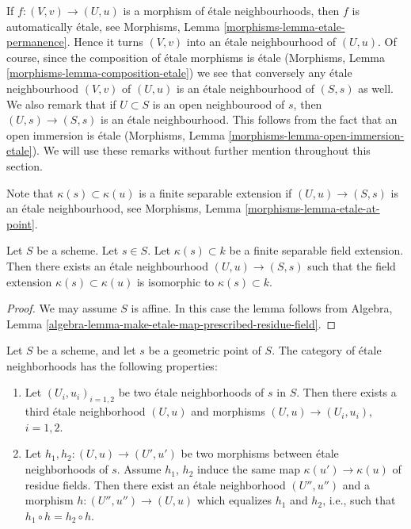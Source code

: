 \noindent
If $f : (V, v) \to (U, u)$ is a morphism of \'etale
neighbourhoods, then $f$ is automatically \'etale, see
Morphisms, Lemma \ref{morphisms-lemma-etale-permanence}.
Hence it turns $(V, v)$ into an \'etale neighbourhood of
$(U, u)$. Of course, since the composition of \'etale morphisms
is \'etale (Morphisms, Lemma \ref{morphisms-lemma-composition-etale})
we see that conversely any \'etale neighbourhood $(V, v)$ of
$(U, u)$ is an \'etale neighbourhood of $(S, s)$ as well.
We also remark that if $U \subset S$ is an open neighbourood
of $s$, then $(U, s) \to (S, s)$ is an \'etale neighbourhood.
This follows from the fact that an open immersion is
\'etale (Morphisms, Lemma \ref{morphisms-lemma-open-immersion-etale}).
We will use these remarks without further mention throughout this
section.

\medskip\noindent
Note that $\kappa(s) \subset \kappa(u)$ is a finite separable extension
if $(U, u) \to (S, s)$ is an \'etale neighbourhood,
see Morphisms, Lemma \ref{morphisms-lemma-etale-at-point}.

\begin{lemma}
\label{lemma-realize-presecribed-residue-field-extension-etale}
Let $S$ be a scheme.
Let $s \in S$.
Let $\kappa(s) \subset k$ be a finite separable field extension.
Then there exists an \'etale neighbourhood $(U, u) \to (S, s)$
such that the field extension $\kappa(s) \subset \kappa(u)$ is
isomorphic to $\kappa(s) \subset k$.
\end{lemma}

\begin{proof}
We may assume $S$ is affine.
In this case the lemma follows from
Algebra, Lemma \ref{algebra-lemma-make-etale-map-prescribed-residue-field}.
\end{proof}

\begin{lemma}
\label{lemma-etale-neighbourhoods-not-quite-filtered}
Let $S$ be a scheme, and let $s$ be a geometric point of $S$.
The category of \'etale neighborhoods has the following properties:
\begin{enumerate}
\item Let $(U_i, u_i)_{i=1, 2}$ be two \'etale neighborhoods of
$s$ in $S$. Then there exists a third \'etale neighborhood
$(U, u)$ and morphisms
$(U, u) \to (U_i, u_i)$, $i = 1, 2$.
\item Let $h_1, h_2: (U, u) \to (U', u')$ be two
morphisms between \'etale neighborhoods of $s$.
Assume $h_1$, $h_2$ induce the same map $\kappa(u') \to \kappa(u)$ of residue
fields. Then there exist an \'etale neighborhood $(U'', u'')$ and a morphism
$h : (U'', u'') \to (U, u)$
which equalizes $h_1$ and $h_2$, i.e., such that
$h_1 \circ h = h_2 \circ h$.
\end{enumerate}
\end{lemma}

